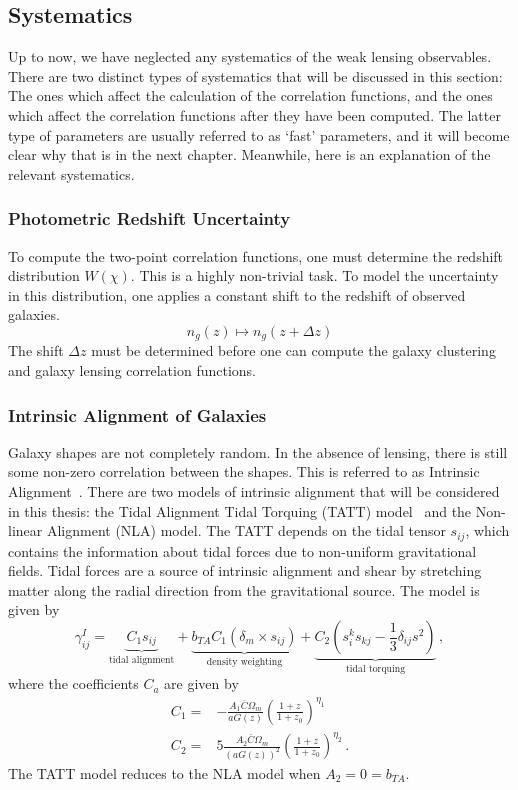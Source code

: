 \subsection{Systematics}
Up to now, we have neglected any systematics of the weak lensing observables. There are two distinct types of systematics that will be discussed in this section: The ones which affect the calculation of the correlation functions, and the ones which affect the correlation functions after they have been computed. The latter type of parameters are usually referred to as `fast' parameters, and it will become clear why that is in the next chapter. Meanwhile, here is an explanation of the relevant systematics.
\subsubsection{Photometric Redshift Uncertainty}\label{sec:dz}
To compute the two-point correlation functions, one must determine the redshift distribution $W(\chi)$. This is a highly non-trivial task. To model the uncertainty in this distribution, one applies a constant shift to the redshift of observed galaxies.
\begin{equation}
	n_g(z) \mapsto n_g(z+\Delta z)
\end{equation}
The shift $\Delta z$ must be determined before one can compute the galaxy clustering and galaxy lensing correlation functions.
\subsubsection{Intrinsic Alignment of Galaxies}\label{sec:IA}
Galaxy shapes are not completely random. In the absence of lensing, there is still some non-zero correlation between the shapes. This is referred to as Intrinsic Alignment~\cite{troxel_intrinsic_2015,scott_dodelson_modern_2021}. There are two models of intrinsic alignment that will be considered in this thesis: the Tidal Alignment Tidal Torquing (TATT) model~\cite{krause_dark_2021,blazek_beyond_2019} and the Non-linear Alignment (NLA) model. The TATT depends on the tidal tensor $s_{ij}$, which contains the information about tidal forces due to non-uniform gravitational fields. Tidal forces are a source of intrinsic alignment and shear by stretching matter along the radial direction from the gravitational source. The model is given by
\begin{equation}
	\gamma_{ij}^I = \underbrace{C_1s_{ij}}_{\text{tidal alignment}}+
	\underbrace{b_{TA}C_1(\delta_m\times s_{ij})}_{\text{density weighting}}+
	\underbrace{C_2\left( s_i^ks_{kj}-\frac{1}{3}\delta_{ij}s^2 \right)}_{\text{tidal torquing}}\,,
\end{equation}
where the coefficients $C_a$ are given by
\begin{equation}
	\begin{split}
		C_1 =& -\frac{A_1\bar{C}\Omega_m}{aG(z)}\left(\frac{1+z}{1+z_0}\right)^{\eta_1} \\
		C_2 =& 5\frac{A_2\bar{C}\Omega_m}{(aG(z))^2}\left(\frac{1+z}{1+z_0}\right)^{\eta_2}\,.
	\end{split}
\end{equation}
The TATT model reduces to the NLA model when $A_2=0=b_{TA}$.
